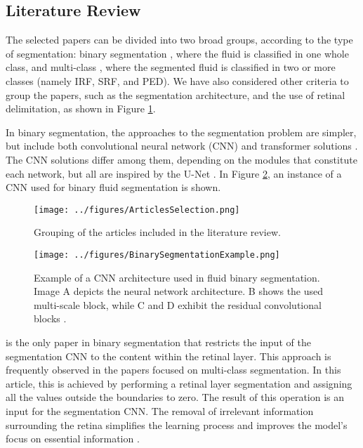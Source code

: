 \subsection{Literature Review}\label{FluidSegmentationLiteratureReview}
The selected papers can be divided into two broad groups, according to the type of segmentation: binary segmentation \parencite{Quek2022, Pawan2021, Liu2021, Guo2020, Wang2021, Wu2023}, where the fluid is classified in one whole class, and multi-class \parencite{Rahil2023, Hassan2021a, Zhang2023, Sappa2021, Xing2022, Tang2022, Padilla2022, Hu2019, Mantel2021, Liu2024, Li2023, Gao2019, Hassan2021b, Lu2019}, where the segmented fluid is classified in two or more classes (namely IRF, SRF, and PED). We have also considered other criteria to group the papers, such as the segmentation architecture, and the use of retinal delimitation, as shown in Figure \ref{fig:ArticlesSelection}.
\par
In binary segmentation, the approaches to the segmentation problem are simpler, but include both convolutional neural network (CNN) \parencite{Pawan2021, Liu2021, Guo2020, Wang2021, Wu2023} and transformer solutions \parencite{Quek2022}. The CNN solutions differ among them, depending on the modules that constitute each network, but all are inspired by the U-Net \parencite{Ronneberger2015}. In Figure \ref{fig:BinarySegmentationExample}, an instance of a CNN used for binary fluid segmentation is shown.
\begin{figure}[!ht]
	\centering
	\texttt{[image: ../figures/ArticlesSelection.png]}
	\caption{Grouping of the articles included in the literature review.}
	\label{fig:ArticlesSelection}
\end{figure}
\begin{figure}[!ht]
	\centering
	\texttt{[image: ../figures/BinarySegmentationExample.png]}
	\caption{Example of a CNN architecture used in fluid binary segmentation. Image A depicts the neural network architecture. B shows the used multi-scale block, while C and D exhibit the residual convolutional blocks \parencite{Guo2020}.}
	\label{fig:BinarySegmentationExample}
\end{figure}
\par
\textcite{Pawan2021} is the only paper in binary segmentation that restricts the input of the segmentation CNN to the content within the retinal layer. This approach is frequently observed in the papers focused on multi-class segmentation. In this article, this is achieved by performing a retinal layer segmentation and assigning all the values outside the boundaries to zero. The result of this operation is an input for the segmentation CNN. The removal of irrelevant information surrounding the retina simplifies the learning process and improves the model's focus on essential information \parencite{Mantel2021}.
